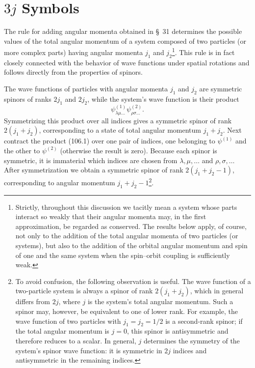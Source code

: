 \section{$3j$ Symbols}

The rule for adding angular momenta obtained in \S~31 determines the possible values of the total angular momentum of a system composed of two particles (or more complex parts) having angular momenta $j_1$ and $j_2$\footnote{Strictly, throughout this discussion we tacitly mean a system whose parts interact so weakly that their angular momenta may, in the first approximation, be regarded as conserved. The results below apply, of course, not only to the addition of the total angular momenta of two particles (or systems), but also to the addition of the orbital angular momentum and spin of one and the same system when the spin--orbit coupling is sufficiently weak.}. This rule is in fact closely connected with the behavior of wave functions under spatial rotations and follows directly from the properties of spinors.

The wave functions of particles with angular momenta $j_1$ and $j_2$ are symmetric spinors of ranks $2j_1$ and $2j_2$, while the system's wave function is their product
\begin{equation}
 \psi^{(1)}_{\lambda\mu\ldots}\psi^{(2)}_{\rho\sigma\ldots}.
 \tag{106.1}
\end{equation}
Symmetrizing this product over all indices gives a symmetric spinor of rank $2(j_1+j_2)$, corresponding to a state of total angular momentum $j_1+j_2$. Next contract the product (106.1) over one pair of indices, one belonging to $\psi^{(1)}$ and the other to $\psi^{(2)}$ (otherwise the result is zero). Because each spinor is symmetric, it is immaterial which indices are chosen from $\lambda,\mu,\ldots$ and $\rho,\sigma,\ldots$ After symmetrization we obtain a symmetric spinor of rank $2(j_1+j_2-1)$, corresponding to angular momentum $j_1+j_2-1$\footnote{To avoid confusion, the following observation is useful. The wave function of a two-particle system is always a spinor of rank $2(j_1+j_2)$, which in general differs from $2j$, where $j$ is the system's total angular momentum. Such a spinor may, however, be equivalent to one of lower rank. For example, the wave function of two particles with $j_1=j_2=1/2$ is a second-rank spinor; if the total angular momentum is $j=0$, this spinor is antisymmetric and therefore reduces to a scalar. In general, $j$ determines the symmetry of the system's spinor wave function: it is symmetric in $2j$ indices and antisymmetric in the remaining indices.}.

